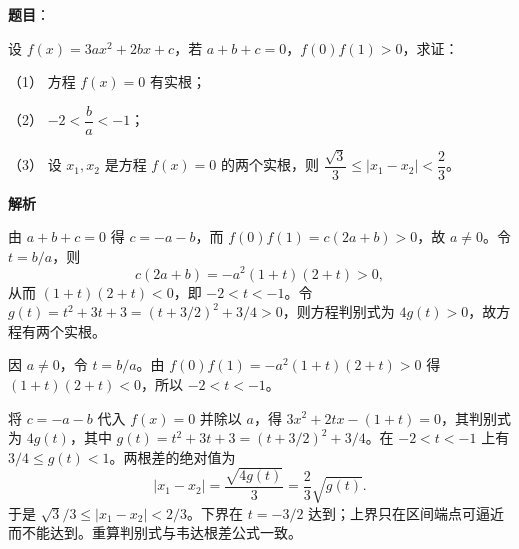 \begin{answer}

\textbf{题目}：

设 $f(x)=3ax^2+2bx+c$，若 $a+b+c=0$，$f(0)f(1)>0$，求证：

（1） 方程 $f(x)=0$ 有实根；

（2） $-2<\dfrac ba<-1$；

（3） 设 $x_1,x_2$ 是方程 $f(x)=0$ 的两个实根，则 $\dfrac{\sqrt3}{3}\leqslant|x_1-x_2|<\dfrac23$。

\textbf{解析}


由 $a+b+c=0$ 得 $c=-a-b$，而 $f(0)f(1)=c(2a+b)>0$，故 $a\ne0$。令 $t=b/a$，则
\nopagebreak[4]
\[
 c(2a+b)=-a^2(1+t)(2+t)>0,
\]
从而 $(1+t)(2+t)<0$，即 $-2<t<-1$。令 $g(t)=t^2+3t+3=(t+3/2)^2+3/4>0$，则方程判别式为 $4g(t)>0$，故方程有两个实根。


因 $a\ne0$，令 $t=b/a$。由 $f(0)f(1)=-a^2(1+t)(2+t)>0$ 得 $(1+t)(2+t)<0$，所以 $-2<t<-1$。


将 $c=-a-b$ 代入 $f(x)=0$ 并除以 $a$，得 $3x^2+2tx-(1+t)=0$，其判别式为 $4g(t)$，其中 $g(t)=t^2+3t+3=(t+3/2)^2+3/4$。在 $-2<t<-1$ 上有 $3/4\le g(t)<1$。两根差的绝对值为
\nopagebreak[4]
\[
 |x_1-x_2|=\frac{\sqrt{4g(t)}}{3}=\frac23\sqrt{g(t)}.
\]
于是 $\sqrt3/3\le |x_1-x_2|<2/3$。下界在 $t=-3/2$ 达到；上界只在区间端点可逼近而不能达到。重算判别式与韦达根差公式一致。




\end{answer}
